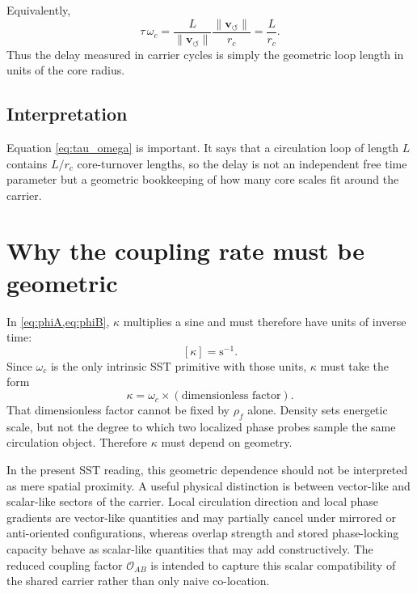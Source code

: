 \documentclass[11pt]{article}
\newcommand{\vnorm}{\lVert \mathbf{v}_{\!\boldsymbol{\circlearrowleft}}\rVert}
\newcommand{\rhoF}{\rho_{\!f}}
\newcommand{\rc}{r_c}
\begin{document}
        Equivalently,
        \begin{equation}
            \tau\,\omega_c
            =
            \frac{L}{\vnorm}\frac{\vnorm}{\rc}
            =
            \frac{L}{\rc}.
            \label{eq:tau_omega}
        \end{equation}
        Thus the delay measured in carrier cycles is simply the geometric loop length in units of the core radius.
        
        \subsection*{Interpretation}
            Equation \eqref{eq:tau_omega} is important. It says that a circulation loop of length \(L\) contains \(L/\rc\) core-turnover lengths, so the delay is not an independent free time parameter but a geometric bookkeeping of how many core scales fit around the carrier.
    
    \section{Why the coupling rate must be geometric}
        
        In \cref{eq:phiA,eq:phiB}, \(\kappa\) multiplies a sine and must therefore have units of inverse time:
        \[
            [\kappa]=\mathrm{s^{-1}}.
        \]
        Since \(\omega_c\) is the only intrinsic SST primitive with those units, \(\kappa\) must take the form
        \begin{equation}
            \kappa=\omega_c \times (\text{dimensionless factor}).
            \label{eq:kappa_structure}
        \end{equation}
        That dimensionless factor cannot be fixed by \(\rhoF\) alone. Density sets energetic scale, but not the degree to which two localized phase probes sample the same circulation object. Therefore \(\kappa\) must depend on geometry.

        In the present SST reading, this geometric dependence should not be interpreted as mere spatial proximity. A useful physical distinction is between vector-like and scalar-like sectors of the carrier. Local circulation direction and local phase gradients are vector-like quantities and may partially cancel under mirrored or anti-oriented configurations, whereas overlap strength and stored phase-locking capacity behave as scalar-like quantities that may add constructively. The reduced coupling factor \(\mathcal{O}_{AB}\) is intended to capture this scalar compatibility of the shared carrier rather than only naive co-location.
        
\end{document}
